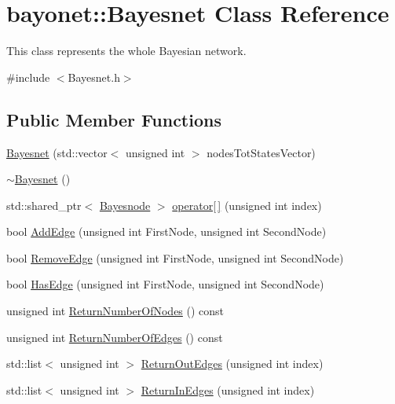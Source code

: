 \hypertarget{classbayonet_1_1_bayesnet}{\section{bayonet\-:\-:Bayesnet Class Reference}
\label{classbayonet_1_1_bayesnet}
}


This class represents the whole Bayesian network.  




{\ttfamily \#include $<$Bayesnet.\-h$>$}

\subsection*{Public Member Functions}
\begin{DoxyCompactItemize}
\item 
\hyperlink{classbayonet_1_1_bayesnet_a27bc4870f26d4bd00953d7589c2d4abd}{Bayesnet} (std\-::vector$<$ unsigned int $>$ nodes\-Tot\-States\-Vector)
\item 
\hyperlink{classbayonet_1_1_bayesnet_af0d3ee29b0676789a3c5d1c33a0e36a2}{$\sim$\-Bayesnet} ()
\item 
std\-::shared\-\_\-ptr$<$ \hyperlink{classbayonet_1_1_bayesnode}{Bayesnode} $>$ \hyperlink{classbayonet_1_1_bayesnet_a805e5513cfef8b16f5f6f38f93aab5db}{operator\mbox{[}$\,$\mbox{]}} (unsigned int index)
\item 
bool \hyperlink{classbayonet_1_1_bayesnet_aba354bf67d39dc73e070e63b9bc45ecd}{Add\-Edge} (unsigned int First\-Node, unsigned int Second\-Node)
\item 
bool \hyperlink{classbayonet_1_1_bayesnet_a0ea810411a987ebeb97b580053ce7c7f}{Remove\-Edge} (unsigned int First\-Node, unsigned int Second\-Node)
\item 
bool \hyperlink{classbayonet_1_1_bayesnet_ae852714069b47eff14918d5a4e53a2dd}{Has\-Edge} (unsigned int First\-Node, unsigned int Second\-Node)
\item 
unsigned int \hyperlink{classbayonet_1_1_bayesnet_aabfe91fab18e3fcaca8c8965f6a59860}{Return\-Number\-Of\-Nodes} () const 
\item 
unsigned int \hyperlink{classbayonet_1_1_bayesnet_af19e4190891a42a729a80c61e97f1947}{Return\-Number\-Of\-Edges} () const 
\item 
std\-::list$<$ unsigned int $>$ \hyperlink{classbayonet_1_1_bayesnet_acb33076271f03ba59ac98a04b762d26b}{Return\-Out\-Edges} (unsigned int index)
\item 
std\-::list$<$ unsigned int $>$ \hyperlink{classbayonet_1_1_bayesnet_a5621b949d8fda17ae0efd9810655b1b3}{Return\-In\-Edges} (unsigned int index)

\end{DoxyCompactItemize}
